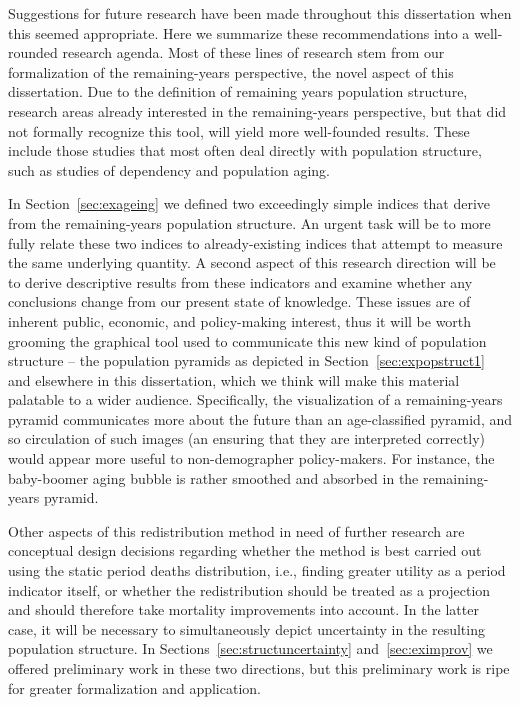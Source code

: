 Suggestions for future research have been made throughout this dissertation when
this seemed appropriate. Here we summarize these recommendations into a
well-rounded research agenda. Most of these lines of research stem
from our formalization of the remaining-years perspective, the novel aspect of
this dissertation. Due to the definition of remaining years population
structure, research areas already interested in the remaining-years perspective,
but that did not formally recognize this tool, will yield more well-founded
results. These include those studies that most often deal directly with
population structure, such as studies of dependency and population aging. 

In Section~\ref{sec:exageing} we defined two exceedingly simple indices
that derive from the remaining-years population structure. An urgent task will
be to more fully relate these two indices to already-existing indices that
attempt to measure the same underlying quantity. A second aspect of this
research direction will be to derive descriptive results from these indicators
and examine whether any conclusions change from our present state of knowledge.
These issues are of inherent public, economic, and policy-making interest, thus
it will be worth grooming the graphical tool used to communicate this new kind
of population structure -- the population pyramids as depicted in
Section~\ref{sec:expopstruct1} and elsewhere in this dissertation, which we
think will make this material palatable to a wider audience. Specifically, the
visualization of a remaining-years pyramid communicates more about the future
than an age-classified pyramid, and so circulation of such images (an ensuring
that they are interpreted correctly) would appear more useful to non-demographer
policy-makers. For instance, the baby-boomer aging bubble is rather smoothed and
absorbed in the remaining-years pyramid. 

Other aspects of this redistribution method in need of further research are
conceptual design decisions regarding whether the method is best carried out
using the static period deaths distribution, i.e., finding greater utility as a
period indicator itself, or whether the redistribution should be treated as a
 projection and should therefore take mortality improvements into account.
In the latter case, it will be necessary to simultaneously depict uncertainty in
the resulting population structure. In
Sections~\ref{sec:structuncertainty} and~\ref{sec:eximprov} we offered
preliminary work in these two directions, but this preliminary work is ripe for
greater formalization and application.

